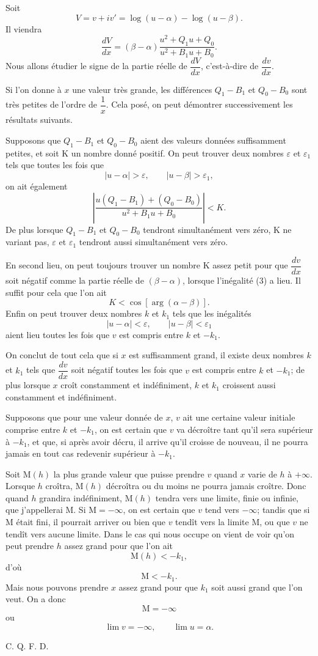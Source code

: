 \documentclass[11pt]{article}
\begin{document}
Soit
\[
V=v+iv'=\log(u-\alpha)-\log(u-\beta).
\]
Il viendra
\[
\frac{dV}{dx}=(\beta-\alpha)\frac{u^2+Q_1u+Q_0}{u^2+B_1u+B_0}.
\]
Nous allons étudier le signe de la partie réelle de $\dfrac{dV}{dx}$, c'est-à-dire de $\dfrac{dv}{dx}$.

Si l'on donne à $x$ une valeur très grande, les différences $Q_1-B_1$ et $Q_0-B_0$ sont très petites de l'ordre de $\dfrac1x$. Cela posé, on peut démontrer successivement les résultats suivants.

Supposons que $Q_1-B_1$ et $Q_0-B_0$ aient des valeurs données suffisamment petites, et soit K un nombre donné positif. On peut trouver deux nombres $\varepsilon$ et $\varepsilon_1$ tels que toutes les fois que
\[
|u-\alpha|>\varepsilon,
\qquad
|u-\beta|>\varepsilon_1,
\]
on ait également
\[
\tag{3}
\left|\frac{u(Q_1-B_1)+(Q_0-B_0)}{u^2+B_1u+B_0}\right|<K.
\]
De plus lorsque $Q_1-B_1$ et $Q_0-B_0$ tendront simultanément vers zéro, K ne variant pas, $\varepsilon$ et $\varepsilon_1$ tendront aussi simultanément vers zéro.

En second lieu, on peut toujours trouver un nombre K assez petit pour que $\dfrac{dv}{dx}$ soit négatif comme la partie réelle de $(\beta-\alpha)$, lorsque l'inégalité (3) a lieu. Il suffit pour cela que l'on ait
\[
K<\cos[\arg(\alpha-\beta)].
\]
Enfin on peut trouver deux nombres $k$ et $k_1$ tels que les inégalités
\[
|u-\alpha|<\varepsilon,
\qquad
|u-\beta|<\varepsilon_1
\]
aient lieu toutes les fois que $v$ est compris entre $k$ et $-k_1$.

On conclut de tout cela que si $x$ est suffisamment grand, il existe deux nombres $k$ et $k_1$ tels que $\dfrac{dv}{dx}$ soit négatif toutes les fois que $v$ est compris entre $k$ et $-k_1$; de plus lorsque $x$ croît constamment et indéfiniment, $k$ et $k_1$ croissent aussi constamment et indéfiniment.

Supposons que pour une valeur donnée de $x$, $v$ ait une certaine valeur initiale comprise entre $k$ et $-k_1$, on est certain que $v$ va décroître tant qu'il sera supérieur à $-k_1$, et que, si après avoir décru, il arrive qu'il croisse de nouveau, il ne pourra jamais en tout cas redevenir supérieur à $-k_1$.

Soit $\mathrm{M}(h)$ la plus grande valeur que puisse prendre $v$ quand $x$ varie de $h$ à $+\infty$. Lorsque $h$ croîtra, $\mathrm{M}(h)$ décroîtra ou du moins ne pourra jamais croître. Donc quand $h$ grandira indéfiniment, $\mathrm{M}(h)$ tendra vers une limite, finie ou infinie, que j'appellerai $\mathrm{M}$. Si $\mathrm{M}=-\infty$, on est certain que $v$ tend vers $-\infty$; tandis que si $\mathrm{M}$ était fini, il pourrait arriver ou bien que $v$ tendît vers la limite $\mathrm{M}$, ou que $v$ ne tendît vers aucune limite. Dans le cas qui nous occupe on vient de voir qu'on peut prendre $h$ assez grand pour que l'on ait
\[
\mathrm{M}(h)<-k_1,
\]
d'où
\[
\mathrm{M}<-k_1.
\]
Mais nous pouvons prendre $x$ assez grand pour que $k_1$ soit aussi grand que l'on veut. On a donc
\[
\mathrm{M}=-\infty
\]
ou
\[
\lim v=-\infty,
\qquad
\lim u=\alpha.
\]
\begin{flushright}C. Q. F. D.\end{flushright}
\end{document}
